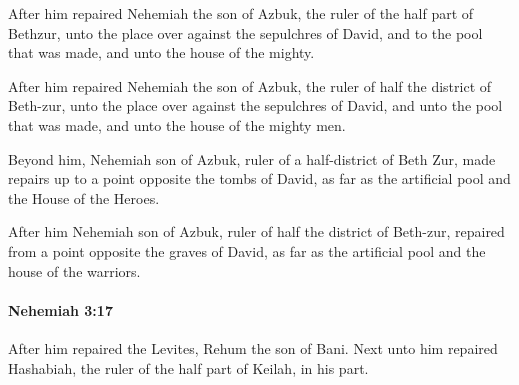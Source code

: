 			After him repaired Nehemiah the son of Azbuk, the ruler of the half part of Bethzur, unto the place over against the sepulchres of David, and to the pool that was made, and unto the house of the mighty.

			\begin{versebox}
					\item[BHS] 
					\item[LXX] 
					\item[ASV] After him repaired Nehemiah the son of Azbuk, the ruler of half the district of Beth-zur, unto the place over against the sepulchres of David, and unto the pool that was made, and unto the house of the mighty men.
					\item[NIV] Beyond him, Nehemiah son of Azbuk, ruler of a half-district of Beth Zur, made repairs up to a point opposite the tombs of David, as far as the artificial pool and the House of the Heroes.
					\item[NRSV] After him Nehemiah son of Azbuk, ruler of half the district of Beth-zur, repaired from a point opposite the graves of David, as far as the artificial pool and the house of the warriors.
			\end{versebox}

		\paragraph{Nehemiah 3:17} %
			\label{NEHEMIAH-3-17}

			After him repaired the Levites, Rehum the son of Bani. Next unto him repaired Hashabiah, the ruler of the half part of Keilah, in his part.

